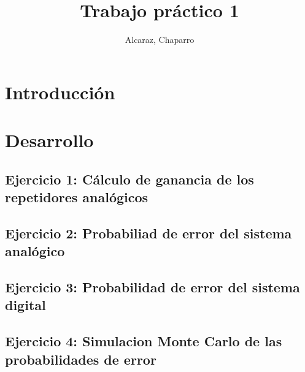\documentclass[12pt]{article}
\title{Trabajo práctico 1}
\author{Alcaraz, Chaparro}
\begin{document}
	
	
	\pagestyle{fancy}
	
	\setcounter{page}{1}
	
	
	\newpage
	
	\tableofcontents
	
	\newpage
	\section{Introducción}
		
		
	
	\section{Desarrollo}	
		\subsection{Ejercicio 1: Cálculo de ganancia de los repetidores analógicos}
	
			
		
		\subsection{Ejercicio 2: Probabiliad de error del sistema analógico}
		
			
		
		\subsection{Ejercicio 3: Probabilidad de error del sistema digital}
		
			
		
		\subsection{Ejercicio 4: Simulacion Monte Carlo de las probabilidades de error}
			
			
\end{document}
